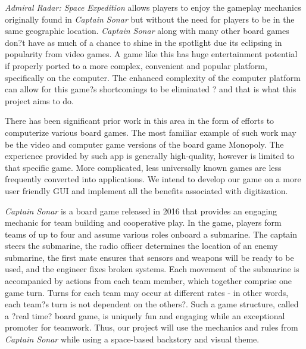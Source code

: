 \textit{Admiral Radar: Space Expedition}  allows players to enjoy the gameplay mechanics originally found in \textit{Captain Sonar} but without the need for players to be in the same geographic location. \textit{Captain Sonar} along with many other board games don?t have as much of a chance to shine in the spotlight due its eclipsing in popularity from video games. A game like this has huge entertainment potential if properly ported to a more complex, convenient and popular platform, specifically on the computer. The enhanced complexity of the computer platform can allow for this game?s shortcomings to be eliminated ? and that is what this project aims to do.

There has been significant prior work in this area in the form of efforts to computerize various board games. The most familiar example of such work may be the video and computer game versions of the board game Monopoly. The experience provided by such app is generally high-quality, however is limited to that specific game. More complicated, less universally known games are less frequently converted into applications. We intend to develop our game on a more user friendly GUI and implement all the benefits associated with digitization.

\textit{Captain Sonar} is a board game released in 2016 that provides an engaging mechanic for team building and cooperative play. In the game, players form teams of up to four and assume various roles onboard a submarine. The captain steers the submarine, the radio officer determines the location of an enemy submarine, the first mate ensures that sensors and weapons will be ready to be used, and the engineer fixes broken systems. Each movement of the submarine is accompanied by actions from each team member, which together comprise one game turn. Turns for each team may occur at different rates - in other words, each team?s turn is not dependent on the others?. Such a game structure, called a ?real time? board game, is uniquely fun and engaging while an exceptional promoter for teamwork. Thus, our project will use the mechanics and rules from \textit{Captain Sonar} while using a space-based backstory and visual theme.